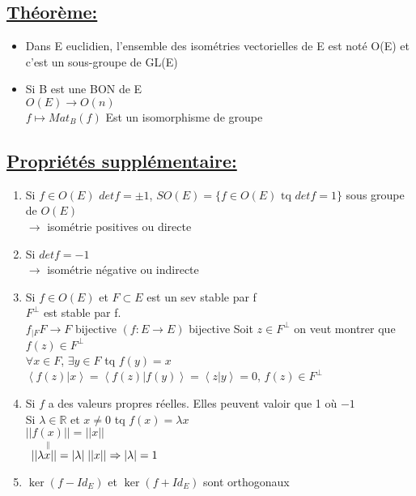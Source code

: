 \documentclass{article}
\newcommand\tab[1][1cm]{\hspace*{#1}}
\newcommand{\scalaire}[2]{\left< #1 | #2\right>}
\begin{document}
\newpage

\subsection{\underline{Théorème:}} 
\begin{itemize}
    \item  Dans E euclidien, l'ensemble des isométries vectorielles de E est noté O(E) et c'est un sous-groupe de GL(E)
    \item Si B est une BON de E\\
    $O(E) \rightarrow O(n)$\\
    $f \longmapsto Mat_B(f)$
    Est un isomorphisme de groupe
\end{itemize}

\subsection{\underline{Propriétés supplémentaire:}} 

\begin{enumerate}
    \item Si $f \in O(E)$ $det f = \pm 1$, $SO(E) = \{f \in O(E) \mbox{ tq } det f = 1\}$ sous groupe de $O(E)$\\
    \tab[5cm] $\rightarrow$ isométrie positives ou directe
    \item Si $det f =-1$\\
    \tab[1cm] $\rightarrow$ isométrie négative ou indirecte
    \item Si $f \in O(E)$ et $F \subset E$ est un sev stable par f\\
    $F^\perp$ est stable par f.\\
    $f_{|F} F \rightarrow F$ bijective $(f: E \rightarrow E)$ bijective
    Soit  $z \in F^\perp$ on veut montrer que $f(z) \in F^\perp$\\
    $\forall x \in F$, $\exists y \in F$ tq $f(y) = x$\\
    $\scalaire{f(z)}{x} = \scalaire{f(z)}{f(y)} = \scalaire{z}{y} = 0$, $f(z) \in F^\perp$
    \item Si $f$ a des valeurs propres réelles. Elles peuvent valoir que 1 où $-1$\\
    Si $\lambda \in \mathbb{R}$ et $x \neq 0$ tq $f(x) = \lambda x$\\
    $\underset{\|}{||f(x)||} = ||x||$\\
    $\tab[1.5mm]||\lambda x|| = |\lambda| \; ||x|| \Rightarrow |\lambda| = 1$
    \item $\ker(f - Id_E)$ et $\ker(f + Id_E)$ sont orthogonaux
\end{enumerate}
\end{document}
